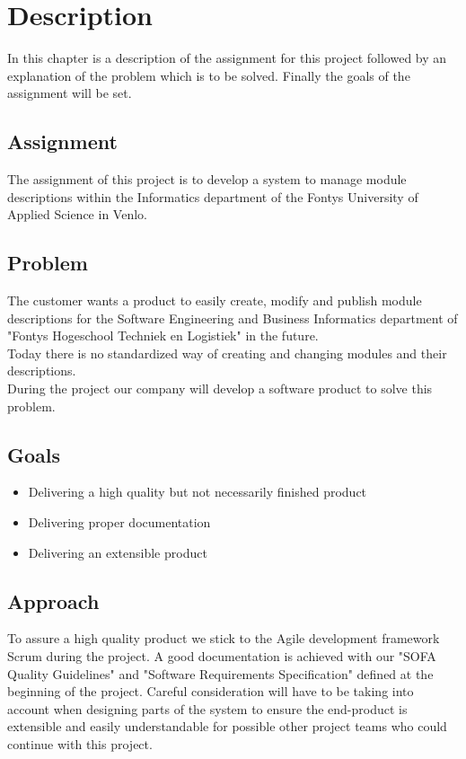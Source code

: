 \chapter{Description}
In this chapter is a description of the assignment for this project followed by an explanation 
of the problem which is to be solved. Finally the goals of the assignment will be set.

\section{Assignment}
The assignment of this project is to develop a system to manage module descriptions within the Informatics
department of the Fontys University of Applied Science in Venlo. 

\section{Problem}
The customer wants a product to easily create, modify and publish module descriptions
for the Software Engineering and Business Informatics department of "Fontys Hogeschool Techniek en Logistiek" in the future.
\newline \\
Today there is no standardized way of creating and changing modules and their descriptions.
\newline \\
During the project our company will develop a software product to solve this problem.

\section{Goals}
\begin{itemize}
    \item Delivering a high quality but not necessarily finished product 
    \item Delivering proper documentation
    \item Delivering an extensible product
\end{itemize}

\newpage

\section{Approach}
To assure a high quality product we stick to the Agile development framework Scrum during the project.
A good documentation is achieved with our "SOFA Quality Guidelines" and "Software Requirements Specification" defined at the beginning of the project.
Careful consideration will have to be taking into account when designing parts of the system to ensure the end-product is extensible and easily understandable for possible other project teams who could continue with this project.


